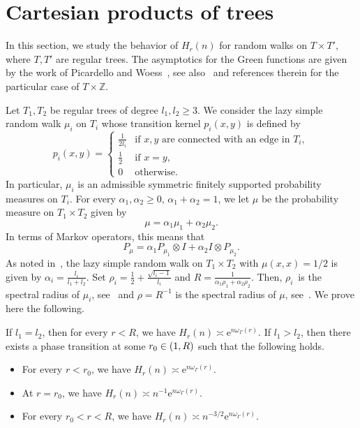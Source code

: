 \documentclass[AHL,Unicode,longabstracts]{cedram}
\newcommand{\Z}{\mathbb{Z}}
\newcommand{\rme}{\mathrm{e}}
\let\oldin\in
\renewcommand{\in}{\mathchoice{\oldin}{\oldin}{\,\oldin\,}{\,\oldin\,}}
\begin{document}
\section{Cartesian products of trees}\label{Sectionbitree}
In this section, we study the behavior of $H_r(n)$ for random walks on $T\times T'$, where $T,T'$ are regular trees. The asymptotics for the Green functions are given by the work of Picardello and Woess~\cite{PicardelloWoessbitree}, see also~\cite[Section~28]{Woessbook} and references therein for the particular case of $T\times \Z$.

Let $T_1,T_2$ be regular trees of degree $l_1,l_2\geq 3$. We consider the lazy simple random walk $\mu_i$ on $T_i$ whose transition kernel $p_i(x,y)$ is defined by
\[
p_i(x,y)=
\begin{cases}
\frac{1}{2l_i} &\text{if } x,y \text{ are connected with an edge in } T_i,\\
\frac{1}{2} &\text{if }x=y,\\
0 &\text{otherwise.}
\end{cases}
\]
In particular, $\mu_i$ is an admissible symmetric finitely supported probability measures on $T_i$. For every $\alpha_1,\alpha_2\geq 0$, $\alpha_1+\alpha_2=1$, we let $\mu$ be the probability measure on $T_1\times T_2$ given by
\begin{equation}\label{defmubitree}
\mu=\alpha_1 \mu_1+\alpha_2\mu_2.
\end{equation}
In terms of Markov operators, this means that
\[
P_{\mu}=\alpha_1 P_{\mu_1}\otimes I+\alpha_2 I\otimes P_{\mu_2}.
\]
As noted in~\cite[Section~3]{PicardelloWoessbitree}, the lazy simple random walk on $T_1\times T_2$ with $\mu(x,x)=1/2$ is given by $\alpha_i=\frac{l_i}{l_1+l_2}$. Set $\rho_i = \frac{1}{2} + \frac{\sqrt{l_i - 1}}{l_i}$ and $R = \frac{1}{\alpha_1 \rho_1 + \alpha_2 \rho_2}$. Then, $\rho_i$~is the spectral radius of $\mu_i$, see~\cite[(2.2)]{PicardelloWoessbitree} and $\rho=R^{-1}$ is the spectral radius of $\mu$, see~\cite[Section~3]{PicardelloWoessbitree}. We prove here the following.
\begin{theo}\label{thmbitree}
If $l_1=l_2$, then for every $r<R$, we have $H_r(n)\asymp \rme^{n\omega_\Gamma(r)}$. If $l_1>l_2$, then there exists a phase transition at some $r_0\in (1,R)$ such that the following holds.
\begin{itemize}
\item For every $r<r_0$, we have $H_r(n)\asymp \rme^{n\omega_\Gamma(r)}$.
\item At $r=r_0$, we have $H_r(n)\asymp n^{-1}\rme^{n\omega_\Gamma(r)}$.
\item For every $r_0<r<R$, we have $H_r(n)\asymp n^{-3/2}\rme^{n\omega_\Gamma(r)}$.
\end{itemize}
\end{theo}
\end{document}
